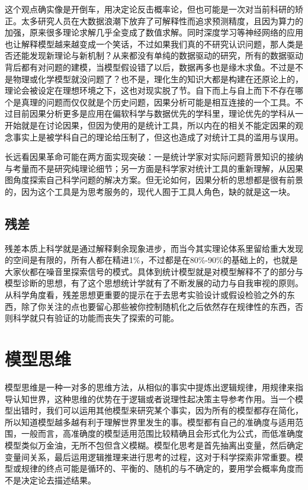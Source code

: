 \documentclass[]{tufte-book}
\begin{document}
这个观点确实像是开倒车，用决定论反击概率论，但也可能是一次对当前科研的矫正。太多研究人员在大数据浪潮下放弃了可解释性而追求预测精度，且因为算力的加强，原来很多理论求解几乎全变成了数值求解。同时深度学习等神经网络的应用也让解释模型越来越变成一个笑话，不过如果我们真的不研究认识问题，那人类是否还能发现新理论与新机制？从来都没有单纯的数据驱动的研究，所有的数据驱动背后都有对问题的建模，当模型假设错了以后，数据再多也是缘木求鱼。不过是不是物理或化学模型就没问题了？也不是，理化生的知识大都是构建在还原论上的，理论会被设定在理想环境之下，这也对现实脱了节。自下而上与自上而下不存在哪个是真理的问题而仅仅就是个历史问题，因果分析可能是相互连接的一个工具。不过目前因果分析更多是应用在偏软科学与数据优先的学科里，理论优先的学科从一开始就是在讨论因果，但因为使用的是统计工具，所以内在的相关不能定因果的观念事实上是被学科自己的理论给压制了，但这也造成了对统计工具的滥用与误用。

长远看因果革命可能在两方面实现突破：一是统计学家对实际问题背景知识的接纳与考量而不是研究纯理论细节；另一方面是科学家对统计工具的重新理解，从因果图角度探索自己科学问题的解决方案。但无论如何，因果分析的思想都是很有前景的，因为这个工具是为思考服务的，现代人囿于工具人角色，缺的就是这一块。

\hypertarget{ux6b8bux5dee}{%
\subsection{残差}\label{ux6b8bux5dee}}

残差本质上科学就是通过解释剩余现象进步，而当今其实理论体系里留给重大发现的空间是有限的，所有人都在精进1\%，不过都是在80\%-90\%的基础上的，也就是大家伙都在噪音里探索信号的模式。具体到统计模型就是对模型解释不了的部分与模型诊断的思想，有了这个思想统计学就有了不断发展的动力与自我审视的原则。从科学角度看，残差思想更重要的提示在于去思考实验设计或假设检验之外的东西，除了你关注的点也要留心那些被你控制随机化之后依然存在规律性的东西，否则科学就只有验证的功能而丧失了探索的可能。

\hypertarget{ux6a21ux578bux601dux7ef4}{%
\section{模型思维}\label{ux6a21ux578bux601dux7ef4}}

模型思维是一种一对多的思维方法，从相似的事实中提炼出逻辑规律，用规律来指导认知世界，这种思维的优势在于逻辑或者说理性起决策主导参考作用。当一个模型出错时，我们可以运用其他模型来研究某个事实，因为所有的模型都存在简化，所以知道模型越多越有利于理解世界里发生的事。模型都有自己的准确度与适用范围，一般而言，高准确度的模型适用范围比较精确且会形式化为公式，而低准确度模型类似万金油，无所不包但含义模糊。模型化思考是首先抽离出变量，然后确定变量间关系，最后运用逻辑推理来进行思考的过程，这对于科学探索非常重要。模型或规律的终点可能是循环的、平衡的、随机的与不确定的，要用学会概率角度而不是决定论去描述结果。
\end{document}
